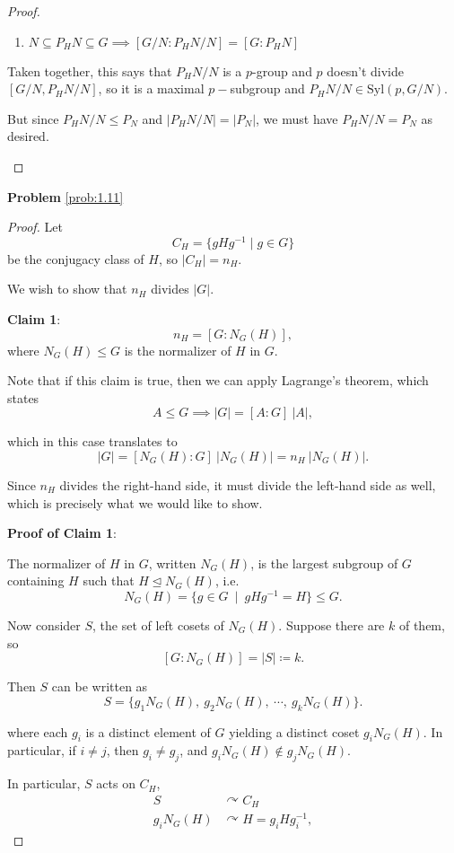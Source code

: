 \begin{proof}
\begin{enumerate}
\begin{enumerate}
        \item $N \subseteq P_H N \subseteq G \implies [G/N : P_H N/ N] = [G: P_H N]$
        
    \end{enumerate}
    
    Taken together, this says that $P_H N/ N$ is a $p$-group and $p$ doesn't divide $[G/N, P_HN / N]$, so it is a maximal $p-$subgroup and $P_HN/N \in \mathrm{Syl}(p, G/N)$. 
    
    But since $P_HN/N \leq P_N$ and $\left|P_HN/N\right| = \left|P_N\right|$, we must have $P_HN/N = P_N$ as desired.
    
\end{enumerate}
\end{proof}


\textbf{Problem} \ref{prob:1.11}
\begin{proof}

Let 
\[ 
C_H = \{ gHg^{-1} \mid g\in G \}
\]
be the conjugacy class of $H$, so $|C_H| = n_H$.

We wish to show that $n_{H}$ divides $|G|$.

\textbf{Claim 1}:
\[
n_{H} = [G: N_G(H)],
\]
where $N_G(H) \leq G$ is the normalizer of $H$ in $G$. 

Note that if this claim is true, then we can apply Lagrange's theorem, which states
$$
A \leq G \implies |G| = [A: G]~|A|,
$$

which in this case translates to
$$
|G| = [N_G(H) : G]~|N_G(H)| = n_H~|N_G(H)|.
$$

Since $n_H$ divides the right-hand side, it must divide the left-hand side as well, which is precisely what we would like to show.

\textbf{Proof of Claim 1}:

The normalizer of $H$ in $G$, written $N_G(H)$, is the largest subgroup of $G$ containing $H$ such that $H \trianglelefteq N_G(H)$, i.e.
\[
N_G(H) = \{g \in G ~\mid~ gHg^{-1} = H \} \leq G.
\]

Now consider $S$, the set of left cosets of $N_G(H)$. Suppose there are $k$ of them, so
\[
[G: N_G(H)] = |S| \coloneqq k.
\]

Then $S$ can be written as
\[
S = \{ g_1 N_G(H), ~g_2 N_G(H), ~\cdots, ~g_k N_G(H) \}.
\]

where each $g_i$ is a distinct element of $G$ yielding a distinct coset $g_i N_G(H)$. In particular, if $i\neq j$, then $g_i \neq g_j$, and $g_i N_G(H) \not \in g_j N_G(H)$.

In particular, $S$ acts on $C_H$,
\begin{align*}
S &\curvearrowright C_H \\
g_i N_G(H) &\curvearrowright H = g_i H g_i^{-1},
\end{align*}


\end{proof}

